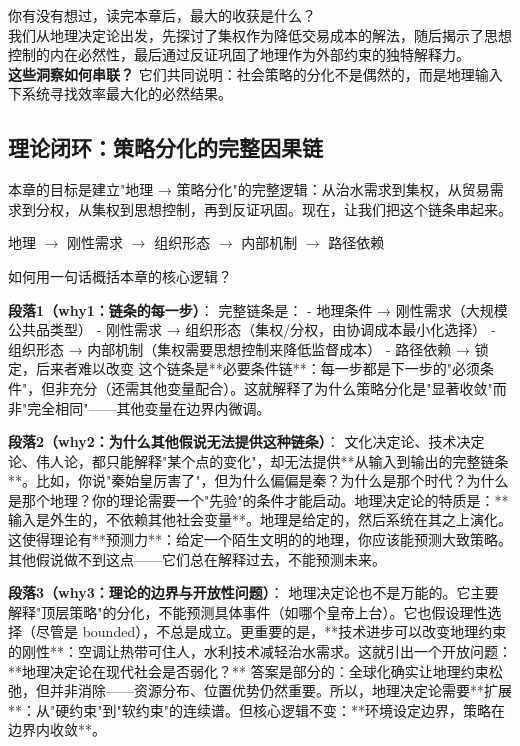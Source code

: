 \documentclass[openany, a4paper, 12pt]{book}
\newenvironment{logicmap}{
	\begin{tcolorbox}[
		colback=blue!5!white,      %
		colframe=blue!50!black,    %
		title=\textbf{逻辑地图 (Logic Map)}, %
		fonttitle=\bfseries,
		sharp corners=south,       %
		boxrule=0.5mm
		]
	\centering
	}{
	\end{tcolorbox}
}
\newenvironment{motivation}{
	\vspace{0.5em}
	\begin{tcolorbox}[
		colback=gray!10,           %
		colframe=gray!60,          %
		title=\textit{本章动机 (Motivation)},
		fonttitle=\bfseries,
		arc=0mm,                   %
		leftrule=3mm               %
		]
		\small \itshape %
	}{
	\end{tcolorbox}
	\vspace{1em}
}
\begin{document}
	\begin{readingnote}
		你有没有想过，读完本章后，最大的收获是什么？\\
	我们从地理决定论出发，先探讨了集权作为降低交易成本的解法，随后揭示了思想控制的内在必然性，最后通过反证巩固了地理作为外部约束的独特解释力。\\
	\textbf{这些洞察如何串联？} 它们共同说明：社会策略的分化不是偶然的，而是地理输入下系统寻找效率最大化的必然结果。
	\end{readingnote}
	
	\subsection{理论闭环：策略分化的完整因果链}
	
	\begin{motivation}
		本章的目标是建立"地理 → 策略分化"的完整逻辑：从治水需求到集权，从贸易需求到分权，从集权到思想控制，再到反证巩固。现在，让我们把这个链条串起来。
	\end{motivation}
	
	\begin{logicmap}
		地理 $\rightarrow$ 刚性需求 $\rightarrow$ 组织形态 $\rightarrow$ 内部机制 $\rightarrow$ 路径依赖
	\end{logicmap}
	
	\begin{questionbox}
		如何用一句话概括本章的核心逻辑？
	\end{questionbox}
	
	\textbf{段落1（why1：链条的每一步）}：  
	完整链条是：  
    - 地理条件 → 刚性需求（大规模公共品类型）  
    - 刚性需求 → 组织形态（集权/分权，由协调成本最小化选择）  
    - 组织形态 → 内部机制（集权需要思想控制来降低监督成本）  
    - 路径依赖 → 锁定，后来者难以改变  
    这个链条是**必要条件链**：每一步都是下一步的"必须条件"，但非充分（还需其他变量配合）。这就解释了为什么策略分化是"显著收敛"而非"完全相同"——其他变量在边界内微调。
	
	\textbf{段落2（why2：为什么其他假说无法提供这种链条）}：  
    文化决定论、技术决定论、伟人论，都只能解释"某个点的变化"，却无法提供**从输入到输出的完整链条**。比如，你说"秦始皇厉害了"，但为什么偏偏是秦？为什么是那个时代？为什么是那个地理？你的理论需要一个"先验"的条件才能启动。地理决定论的特质是：**输入是外生的，不依赖其他社会变量**。地理是给定的，然后系统在其之上演化。这使得理论有**预测力**：给定一个陌生文明的的地理，你应该能预测大致策略。其他假说做不到这点——它们总在解释过去，不能预测未来。
	
	\textbf{段落3（why3：理论的边界与开放性问题）}：  
	地理决定论也不是万能的。它主要解释"顶层策略"的分化，不能预测具体事件（如哪个皇帝上台）。它也假设理性选择（尽管是 bounded），不总是成立。更重要的是，**技术进步可以改变地理约束的刚性**：空调让热带可住人，水利技术减轻治水需求。这就引出一个开放问题：**地理决定论在现代社会是否弱化？** 答案是部分的：全球化确实让地理约束松弛，但并非消除——资源分布、位置优势仍然重要。所以，地理决定论需要**扩展**：从"硬约束"到"软约束"的连续谱。但核心逻辑不变：**环境设定边界，策略在边界内收敛**。
	
\end{document}
